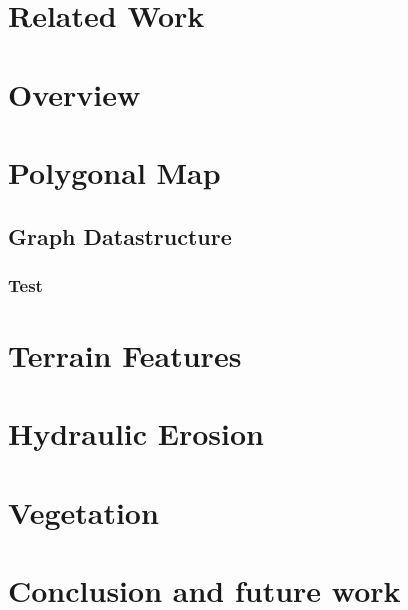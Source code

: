 \documentclass[journal, letterpaper]{IEEEtran}
\begin{document}
\section{Related Work}

\section{Overview}

\section{Polygonal Map}

\subsection{Graph Datastructure}

\subsubsection{Test}

\section{Terrain Features}

\section{Hydraulic Erosion}

\section{Vegetation}

\section{Conclusion and future work}
\end{document}
